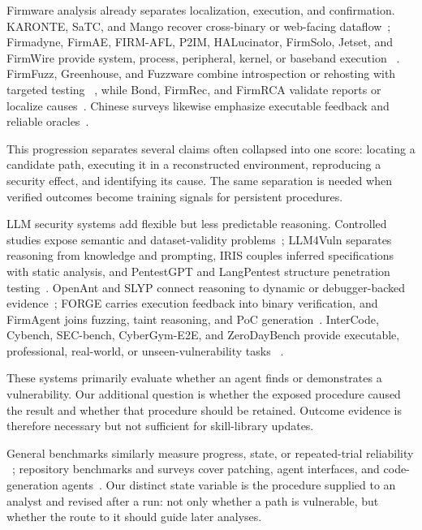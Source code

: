 \documentclass[11pt]{article}
\begin{document}
Firmware analysis already separates localization, execution, and confirmation.  KARONTE,
SaTC, and Mango recover cross-binary or web-facing dataflow~\cite{karonte,satc,mango};
Firmadyne, FirmAE, FIRM-AFL, P2IM, HALucinator, FirmSolo, Jetset, and FirmWire provide
system, process, peripheral, kernel, or baseband execution
~\cite{firmadyne,firmae,firmafl,p2im,halucinator,firmsolo,jetset,firmwire}.  FirmFuzz,
Greenhouse, and Fuzzware combine introspection or rehosting with targeted testing
~\cite{firmfuzz,greenhouse,fuzzware}, while Bond, FirmRec, and FirmRCA validate reports or
localize causes~\cite{bond,firmrec,firmrca}.  Chinese surveys likewise emphasize
executable feedback and reliable oracles~\cite{josdefectsurvey,josfuzzsurvey}.

This progression separates several claims often collapsed into one score: locating a
candidate path, executing it in a reconstructed environment, reproducing a security
effect, and identifying its cause.  The same separation is needed when verified outcomes
become training signals for persistent procedures.

LLM security systems add flexible but less predictable reasoning.  Controlled studies
expose semantic and dataset-validity problems~\cite{steenhoek2024vulndetect,primevul};
LLM4Vuln separates reasoning from knowledge and prompting, IRIS couples inferred
specifications with static analysis, and PentestGPT and LangPentest structure penetration
testing~\cite{llm4vuln,iris,pentestgpt,langpentestzh}.  OpenAnt and SLYP connect reasoning
to dynamic or debugger-backed evidence~\cite{openant,slyp}; FORGE carries execution
feedback into binary verification, and FirmAgent joins fuzzing, taint reasoning, and PoC
generation~\cite{forge,firmagent}.  InterCode, Cybench, SEC-bench, CyberGym-E2E, and
ZeroDayBench provide executable, professional, real-world, or unseen-vulnerability tasks
~\cite{intercode,cybench,secbench,cybergym,zerodaybench}.

These systems primarily evaluate whether an agent finds or demonstrates a vulnerability.
Our additional question is whether the exposed procedure caused the result and whether
that procedure should be retained.  Outcome evidence is therefore necessary but not
sufficient for skill-library updates.

General benchmarks similarly measure progress, state, or repeated-trial reliability
~\cite{agentboard,toolsandbox,taubench}; repository benchmarks and surveys cover patching,
agent interfaces, and code-generation agents~\cite{swebench,sweagent,codeagentsurveyzh}.
Our distinct state variable is the procedure supplied to an analyst and revised after a
run: not only whether a path is vulnerable, but whether the route to it should guide
later analyses.
\end{document}
